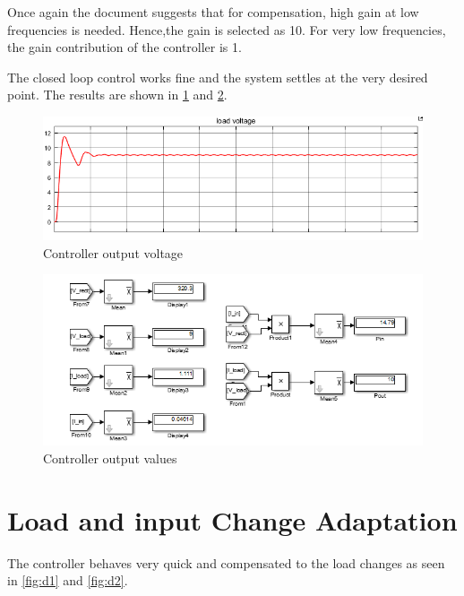 \documentclass[12pt]{article}
\begin{document}
Once again the document suggests that for compensation, high gain at low frequencies is needed. Hence,the gain is selected as 10. For very low frequencies, the gain contribution of the controller is 1. 

The closed loop control works fine and the system settles at the very desired point. The results are shown in \ref{fig:controlled}  and \ref{fig:controllerout}.
\begin{figure}[H]
    \centering
    \includegraphics[width=14cm]{controlledvoltage}
    \caption{Controller output voltage}
    \label{fig:controlled}
\end{figure}

\begin{figure}[H]
    \centering
    \includegraphics[width=14cm]{controlledoutput}
    \caption{Controller output values}
    \label{fig:controllerout}
\end{figure}

\section{Load and input Change Adaptation}

The controller behaves very quick and compensated to the load changes as seen in \ref{fig:d1} and \ref{fig:d2}.
\end{document}
